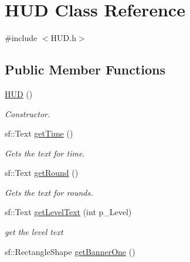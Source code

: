 \hypertarget{class_h_u_d}{}\section{H\+UD Class Reference}
\label{class_h_u_d}


{\ttfamily \#include $<$H\+U\+D.\+h$>$}

\subsection*{Public Member Functions}
\begin{DoxyCompactItemize}
\item 
\mbox{\label{class_h_u_d_a568b8ee1591f9ba3ed36ae05966f6b56}} 
\mbox{\hyperlink{class_h_u_d_a568b8ee1591f9ba3ed36ae05966f6b56}{H\+UD}} ()
\begin{DoxyCompactList}\small\item\em Constructor. \end{DoxyCompactList}\item 
\mbox{\label{class_h_u_d_a9f8a0c3cb435e31849af8dd1432a65aa}} 
sf\+::\+Text \mbox{\hyperlink{class_h_u_d_a9f8a0c3cb435e31849af8dd1432a65aa}{get\+Time}} ()
\begin{DoxyCompactList}\small\item\em Gets the text for time. \end{DoxyCompactList}\item 
\mbox{\label{class_h_u_d_a4684cc70c1e4dff743f6f77444f0cb74}} 
sf\+::\+Text \mbox{\hyperlink{class_h_u_d_a4684cc70c1e4dff743f6f77444f0cb74}{get\+Round}} ()
\begin{DoxyCompactList}\small\item\em Gets the text for rounds. \end{DoxyCompactList}\item 
\mbox{\label{class_h_u_d_a9b5b924a6ccd69cb9bc3df1f32248fb5}} 
sf\+::\+Text \mbox{\hyperlink{class_h_u_d_a9b5b924a6ccd69cb9bc3df1f32248fb5}{get\+Level\+Text}} (int p\+\_\+\+Level)
\begin{DoxyCompactList}\small\item\em get the level text \end{DoxyCompactList}\item 
sf\+::\+Rectangle\+Shape \mbox{\hyperlink{class_h_u_d_afb3ca25c4b8f2c27bb45712472b8c3b3}{get\+Banner\+One}} ()

\end{DoxyCompactItemize}
